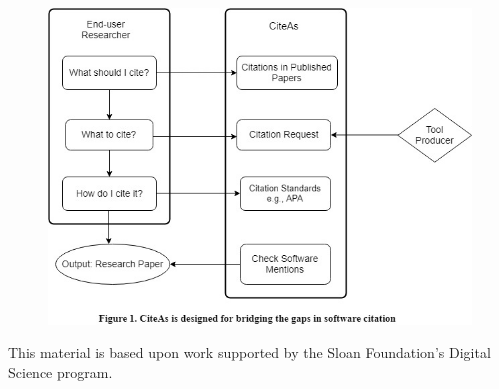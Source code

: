 \documentclass[sigchi-a,screen]{acmart}
\begin{document}
\begin{figure}[H]
  \includegraphics[width=1\textwidth]{SoftciteProcessWorkshop_Figure1.jpg}
\end{figure}



\begin{acks}
This material is based upon work supported by the Sloan Foundation's Digital Science program.
\end{acks}
\end{document}
